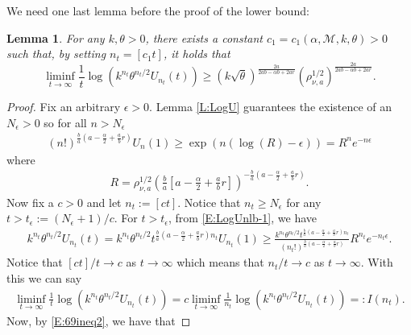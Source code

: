 \documentclass[a4paper,11pt]{article}
\numberwithin{equation}{section}
\numberwithin{equation}{section}
\theoremstyle{plain}
\newtheorem{lemma}[theorem]{Lemma}
\theoremstyle{definition}
\begin{document}
We need one last lemma before the proof of the lower bound:

\begin{lemma} \label{L:logUnlb}
  For any $k,\theta >0$, there exists a constant $c_1 = c_1(\alpha,\mathcal{M}, k, \theta) >0$ such
  that, by setting $n_t = [c_1 t]$, it holds that
  \begin{equation}\label{E:69ineq}
    \liminf_{t \to \infty} \frac{1}{t} \log( k^{n_t} \theta^{n_t/2}U_{n_t}(t)) \ge
    \left( k \sqrt{\theta} \right)^{\frac{2a}{2ab-\alpha b + 2ar}} \left( \rho_{\nu,a}^{1/2} \right)^{\frac{2a}{2ab-\alpha b + 2ar}}.
  \end{equation}
\end{lemma}
\begin{proof}
  Fix an arbitrary $\epsilon > 0$. Lemma \ref{L:LogU} guarantees the existence of an $N_\epsilon >0$
  so for all $n>N_\epsilon$
  \begin{align} \label{E:LogUnlb-1}
    (n!)^{\frac{b}{a}\left( a - \frac{\alpha}{2} + \frac{a}{b}r \right)} U_n(1) \ge \exp\left( n(\log(R)-\epsilon) \right) = R^n e^{-n\epsilon }
  \end{align}
  where
  \begin{align*}
    R = \rho_{\nu,a}^{1/2}  \left( \frac{b}{a}\left[ a - \frac{\alpha}{2} + \frac{a}{b}r \right ] \right)^{- \frac{b}{a}\left( a - \frac{\alpha}{2} + \frac{a}{b}r \right) }.
  \end{align*}
  Now fix a $c>0$ and let $n_t := [ct]$. Notice that $n_t \ge N_\epsilon$ for any $t>t_\epsilon :=
  (N_\epsilon +1)/c$.  For $t > t_\epsilon$, from \eqref{E:LogUnlb-1}, we have
  \begin{align} \label{E:69ineq2}
        k^{n_t}\theta^{n_t/2}U_{n_t}(t)
    =   k^{n_t} \theta^{n_t/2} t^{\frac{b}{a} \left( a-\frac{\alpha}{2} + \frac{a}{b}r \right)n_t } U_{n_t}(1)
    \ge \frac{ k^{n_t} \theta^{n_t/2} t^{\frac{b}{a} \left( a-\frac{\alpha}{2} + \frac{a}{b}r \right)n_t } }{ (n_t!)^{\frac{b}{a} \left(a-\frac{\alpha}{2} +\frac{a}{b}r \right)} } R^{n_t}e^{-n_t \epsilon}.
  \end{align}
  Notice that $[ct]/t \to c$ as $t \to \infty$ which means that $n_t/t \to c$ as $t \to \infty$.
  With this we can say
  \begin{align*}
      \liminf_{t \to \infty} \frac{1}{t} \log \left( k^{n_t} \theta^{n_t/2} U_{n_t}(t) \right)
    = c \liminf_{t\to \infty} \frac{1}{n_t} \log \left( k^{n_t} \theta^{n_t/2} U_{n_t}(t) \right)
    = : I(n_t).
  \end{align*}
  Now, by \eqref{E:69ineq2}, we have that

\end{proof}
\end{document}
